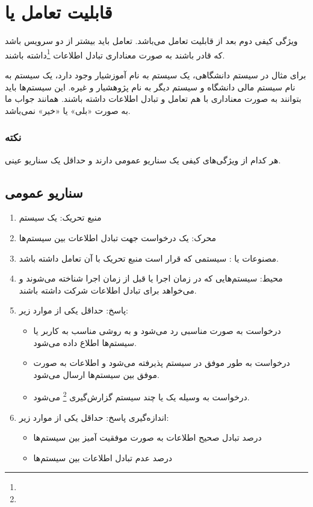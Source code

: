 \newpage
\section{قابلیت تعامل یا }

ویژگی کیفی دوم بعد از  قابلیت تعامل می‌باشد. تعامل باید بیشتر
از دو سرویس باشد که قادر باشند به صورت معناداری تبادل اطلاعات
\footnote{}داشته باشند.

برای مثال در سیستم دانشگاهی، یک سیستم به نام آموزشیار وجود دارد، یک سیستم به نام
سیستم مالی دانشگاه و سیستم دیگر به نام پژوهشیار و غیره. این سیستم‌ها باید
بتوانند به صورت معناداری با هم تعامل و تبادل اطلاعات داشته باشند. همانند
 جواب ما به صورت «بلی» یا «خیر» نمی‌باشد.

\subsubsection*{نکته}

هر کدام از ویژگی‌های کیفی یک سناریو عمومی دارند و حداقل یک سناریو عینی.

\subsection{سناریو عمومی}

\begin{enumerate}
    \item منبع تحریک: یک سیستم
    \item محرک: یک درخواست جهت تبادل اطلاعات بین سیستم‌ها
    \item مصنوعات یا : سیستمی که قرار است منبع تحریک با آن تعامل
    داشته باشد.
    \item محیط: سیستم‌هایی که در زمان اجرا یا قبل از زمان اجرا شناخته می‌شوند و
    می‌خواهد برای تبادل اطلاعات شرکت داشته باشند.
    \item پاسخ: حداقل یکی از موارد زیر:
    \begin{itemize}
        \item درخواست به صورت مناسبی رد می‌شود و به روشی مناسب به کاربر یا
        سیستم‌ها اطلاع داده می‌شود.
        \item درخواست به طور موفق در سیستم پذیرفته می‌شود و اطلاعات به صورت موفق
        بین سیستم‌ها ارسال می‌شود.
        \item درخواست به وسیله یک یا چند سیستم گزارش‌گیری
        \footnote{} می‌شود.
    \end{itemize}
    \item اندازه‌گیری پاسخ: حداقل یکی از موارد زیر:
    \begin{itemize}
        \item درصد تبادل صحیح اطلاعات به صورت موفقیت آمیز بین سیستم‌ها
        \item درصد عدم تبادل اطلاعات بین سیستم‌ها
    \end{itemize}
\end{enumerate}


